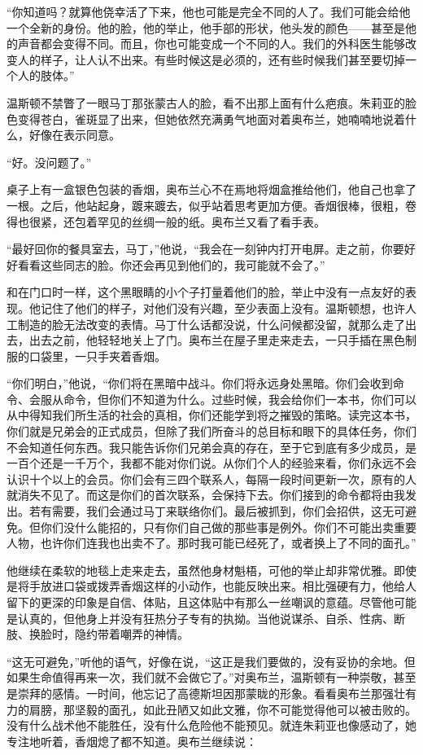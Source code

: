 ``你知道吗？就算他侥幸活了下来，他也可能是完全不同的人了。我们可能会给他一个全新的身份。他的脸，他的举止，他手部的形状，他头发的颜色------甚至是他的声音都会变得不同。而且，你也可能变成一个不同的人。我们的外科医生能够改变人的样子，让人认不出来。有些时候这是必须的，还有些时候我们甚至要切掉一个人的肢体。''

温斯顿不禁瞥了一眼马丁那张蒙古人的脸，看不出那上面有什么疤痕。朱莉亚的脸色变得苍白，雀斑显了出来，但她依然充满勇气地面对着奥布兰，她喃喃地说着什么，好像在表示同意。

``好。没问题了。''

桌子上有一盒银色包装的香烟，奥布兰心不在焉地将烟盒推给他们，他自己也拿了一根。之后，他站起身，踱来踱去，似乎站着思考更加方便。香烟很棒，很粗，卷得也很紧，还包着罕见的丝绸一般的纸。奥布兰又看了看手表。

``最好回你的餐具室去，马丁，''他说，``我会在一刻钟内打开电屏。走之前，你要好好看看这些同志的脸。你还会再见到他们的，我可能就不会了。''

和在门口时一样，这个黑眼睛的小个子打量着他们的脸，举止中没有一点友好的表现。他记住了他们的样子，对他们没有兴趣，至少表面上没有。温斯顿想，也许人工制造的脸无法改变的表情。马丁什么话都没说，什么问候都没留，就那么走了出去，出去之前，他轻轻地关上了门。奥布兰在屋子里走来走去，一只手插在黑色制服的口袋里，一只手夹着香烟。

``你们明白，''他说，``你们将在黑暗中战斗。你们将永远身处黑暗。你们会收到命令、会服从命令，但你们不知道为什么。过些时候，我会给你们一本书，你们可以从中得知我们所生活的社会的真相，你们还能学到将之摧毁的策略。读完这本书，你们就是兄弟会的正式成员，但除了我们所奋斗的总目标和眼下的具体任务，你们不会知道任何东西。我只能告诉你们兄弟会真的存在，至于它到底有多少成员，是一百个还是一千万个，我都不能对你们说。从你们个人的经验来看，你们永远不会认识十个以上的会员。你们会有三四个联系人，每隔一段时间更新一次，原有的人就消失不见了。而这是你们的首次联系，会保持下去。你们接到的命令都将由我发出。若有需要，我们会通过马丁来联络你们。最后被抓到，你们会招供，这无可避免。但你们没什么能招的，只有你们自己做的那些事是例外。你们不可能出卖重要人物，也许你们连我也出卖不了。那时我可能已经死了，或者换上了不同的面孔。''

他继续在柔软的地毯上走来走去，虽然他身材魁梧，可他的举止却非常优雅。即使是将手放进口袋或拨弄香烟这样的小动作，也能反映出来。相比强硬有力，他给人留下的更深的印象是自信、体贴，且这体贴中有那么一丝嘲讽的意蕴。尽管他可能是认真的，但他身上并没有狂热分子专有的执拗。当他说谋杀、自杀、性病、断肢、换脸时，隐约带着嘲弄的神情。

``这无可避免，''听他的语气，好像在说，``这正是我们要做的，没有妥协的余地。但如果生命值得再来一次，我们就不会做它了。''对奥布兰，温斯顿有一种崇敬，甚至是崇拜的感情。一时间，他忘记了高德斯坦因那蒙眬的形象。看看奥布兰那强壮有力的肩膀，那坚毅的面孔，如此丑陋又如此文雅，你不可能觉得他可以被击败的。没有什么战术他不能胜任，没有什么危险他不能预见。就连朱莉亚也像感动了，她专注地听着，香烟熄了都不知道。奥布兰继续说：


